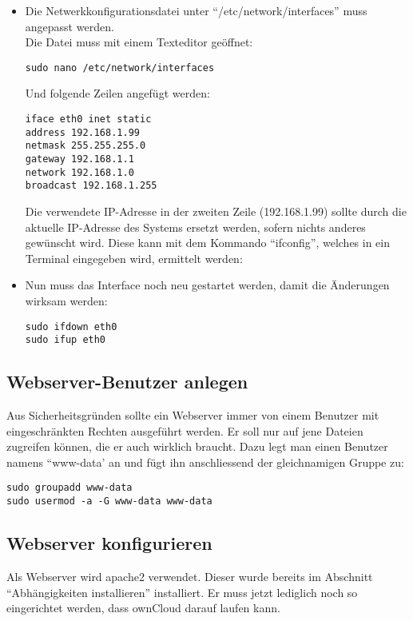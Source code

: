 \begin{itemize}
  \item Die Netwerkkonfigurationsdatei unter ``/etc/network/interfaces'' muss angepasst werden.\\ Die Datei muss mit einem Texteditor geöffnet:
    \begin{lstlisting}
sudo nano /etc/network/interfaces
    \end{lstlisting} 
Und folgende Zeilen angefügt werden:
    \begin{lstlisting}
iface eth0 inet static
address 192.168.1.99
netmask 255.255.255.0
gateway 192.168.1.1
network 192.168.1.0
broadcast 192.168.1.255
    \end{lstlisting}
Die verwendete IP-Adresse in der zweiten Zeile (192.168.1.99) sollte durch die aktuelle IP-Adresse des Systems ersetzt werden, sofern nichts anderes gewünscht wird. Diese kann mit dem Kommando ``ifconfig'', welches in ein Terminal eingegeben wird, ermittelt werden:
  \item Nun muss das Interface noch neu gestartet werden, damit die Änderungen wirksam werden:
    \begin{lstlisting}
sudo ifdown eth0
sudo ifup eth0
    \end{lstlisting}
\end{itemize}

\subsection{Webserver-Benutzer anlegen}
Aus Sicherheitsgründen sollte ein Webserver immer von einem Benutzer mit eingeschränkten Rechten ausgeführt werden. Er soll nur auf jene Dateien zugreifen können, die er auch wirklich braucht. Dazu legt man einen Benutzer namens ``www-data' an und fügt ihn anschliessend der gleichnamigen Gruppe zu:

\begin{lstlisting}
sudo groupadd www-data
sudo usermod -a -G www-data www-data
\end{lstlisting}

\subsection{Webserver konfigurieren}
Als Webserver wird apache2 verwendet. Dieser wurde bereits im Abschnitt ``Abhängigkeiten installieren'' installiert. Er muss jetzt lediglich noch so eingerichtet werden, 
dass ownCloud darauf laufen kann.


